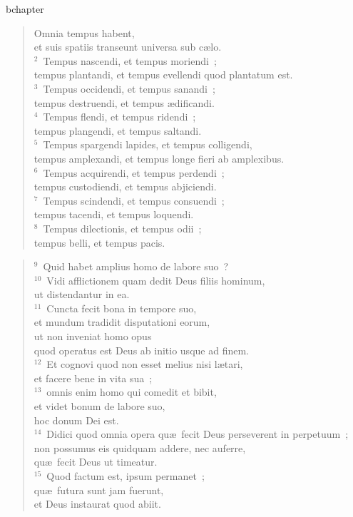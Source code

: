 bchapter\begin{verse}\vspace{-19pt}Omnia tempus habent,\\ et suis spatiis transeunt universa sub c\ae lo.\\
${}^{2}$~Tempus nascendi, et tempus moriendi~;\\ tempus plantandi, et tempus evellendi quod plantatum est.\\
${}^{3}$~Tempus occidendi, et tempus sanandi~;\\ tempus destruendi, et tempus \ae dificandi.\\
${}^{4}$~Tempus flendi, et tempus ridendi~;\\ tempus plangendi, et tempus saltandi.\\
${}^{5}$~Tempus spargendi lapides, et tempus colligendi,\\ tempus amplexandi, et tempus longe fieri ab amplexibus.\\
${}^{6}$~Tempus acquirendi, et tempus perdendi~;\\ tempus custodiendi, et tempus abjiciendi.\\
${}^{7}$~Tempus scindendi, et tempus consuendi~;\\ tempus tacendi, et tempus loquendi.\\
${}^{8}$~Tempus dilectionis, et tempus odii~;\\ tempus belli, et tempus pacis.\end{verse}


\begin{verse}${}^{9}$~Quid habet amplius homo de labore suo~?\\
${}^{10}$~Vidi afflictionem quam dedit Deus filiis hominum,\\ ut distendantur in ea.\\
${}^{11}$~Cuncta fecit bona in tempore suo,\\ et mundum tradidit disputationi eorum,\\ ut non inveniat homo opus\\ quod operatus est Deus ab initio usque ad finem.\\
${}^{12}$~Et cognovi quod non esset melius nisi l\ae tari,\\ et facere bene in vita sua~;\\
${}^{13}$~omnis enim homo qui comedit et bibit,\\ et videt bonum de labore suo,\\ hoc donum Dei est.\\
${}^{14}$~Didici quod omnia opera qu\ae\ fecit Deus perseverent in perpetuum~;\\ non possumus eis quidquam addere, nec auferre,\\ qu\ae\ fecit Deus ut timeatur.\\
${}^{15}$~Quod factum est, ipsum permanet~;\\ qu\ae\ futura sunt jam fuerunt,\\ et Deus instaurat quod abiit.\end{verse}


